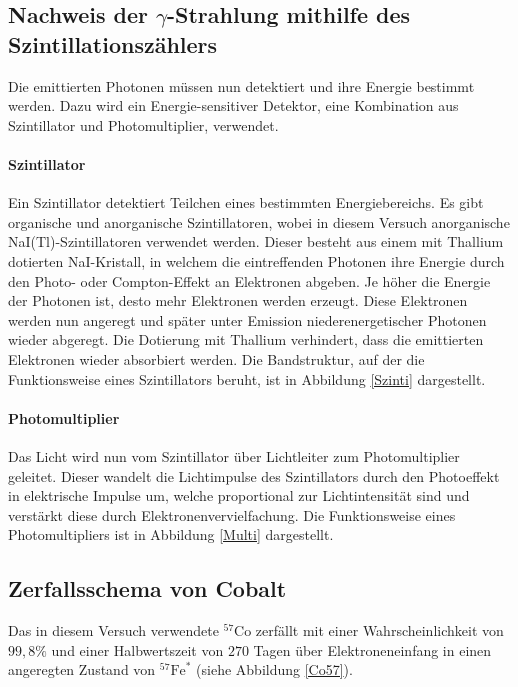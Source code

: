  \subsection{Nachweis der $\gamma$-Strahlung mithilfe des Szintillationszählers}
 Die emittierten Photonen müssen nun detektiert und ihre Energie bestimmt werden. Dazu wird ein Energie-sensitiver Detektor, eine Kombination aus Szintillator und Photomultiplier, verwendet.
 \paragraph{Szintillator} Ein Szintillator detektiert Teilchen eines bestimmten Energiebereichs. Es gibt organische und anorganische Szintillatoren, wobei in diesem Versuch anorganische NaI(Tl)-Szintillatoren verwendet werden. Dieser besteht aus einem mit Thallium dotierten NaI-Kristall, in welchem die eintreffenden Photonen ihre Energie durch den Photo- oder Compton-Effekt an Elektronen abgeben. Je höher die Energie der Photonen ist, desto mehr Elektronen werden erzeugt. Diese Elektronen werden nun angeregt und später unter Emission  niederenergetischer Photonen wieder abgeregt. Die Dotierung mit Thallium verhindert, dass die emittierten Elektronen wieder absorbiert werden. Die Bandstruktur, auf der die Funktionsweise eines Szintillators beruht, ist in Abbildung \ref{Szinti} dargestellt.
 
 \paragraph{Photomultiplier}
 Das Licht wird nun vom Szintillator über Lichtleiter zum Photomultiplier geleitet. Dieser wandelt die Lichtimpulse des Szintillators durch den Photoeffekt in elektrische Impulse um, welche proportional zur Lichtintensität sind und verstärkt diese durch Elektronenvervielfachung. Die Funktionsweise eines Photomultipliers ist in Abbildung \ref{Multi} dargestellt.
 

\subsection{Zerfallsschema von Cobalt}

Das in diesem Versuch verwendete $^{57}$Co zerfällt mit einer Wahrscheinlichkeit von $99,8\%$ und einer Halbwertszeit von $270$ Tagen über Elektroneneinfang in einen angeregten Zustand von $^{57}\mathrm{Fe}^*$ (siehe Abbildung \ref{Co57}).

